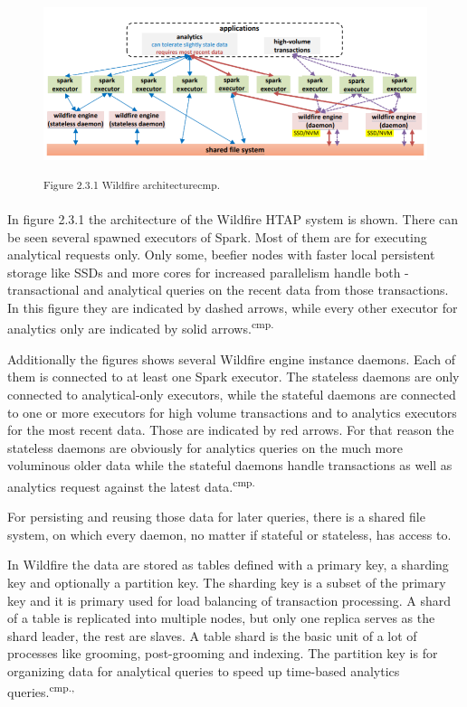 \begin{figure}[h]
\centering
\includegraphics[width=\textwidth]{images/wildfire_architecture.png}

\textsuperscript{Figure 2.3.1 Wildfire architecture}\textsuperscript{cmp.\cite{29}}
\end{figure}

In figure 2.3.1 the architecture of the Wildfire HTAP system is shown. There can be seen several spawned executors of Spark. Most of them are for executing analytical requests only. Only some, beefier nodes with faster local persistent storage like SSDs and more cores for increased parallelism handle both - transactional and analytical queries on the recent data from those transactions. In this figure they are indicated by dashed arrows, while every other executor for analytics only are indicated by solid arrows.\textsuperscript{cmp.\cite{29}}

Additionally the figures shows several Wildfire engine instance daemons. Each of them is connected to at least one Spark executor. The stateless daemons are only connected to analytical-only executors, while the stateful daemons are connected to one or more executors for high volume transactions and to analytics executors for the most recent data. Those are indicated by red arrows. For that reason the stateless daemons are obviously for analytics queries on the much more voluminous older data while the stateful daemons handle transactions as well as analytics request against the latest data.\textsuperscript{cmp.\cite{29}}

For persisting and reusing those data for later queries, there is a shared file system, on which every daemon, no matter if stateful or stateless, has access to.%


In Wildfire the data are stored as tables defined with a primary key, a sharding key and optionally a partition key. The sharding key is a subset of the primary key and it is primary used for load balancing of transaction processing. A shard of a table is replicated into multiple nodes, but only one replica serves as the shard leader, the rest are slaves. A table shard is the basic unit of a lot of processes like grooming, post-grooming and indexing. The partition key is for organizing data for analytical queries to speed up time-based analytics queries.\textsuperscript{cmp.\cite{29}, \cite{30}}

